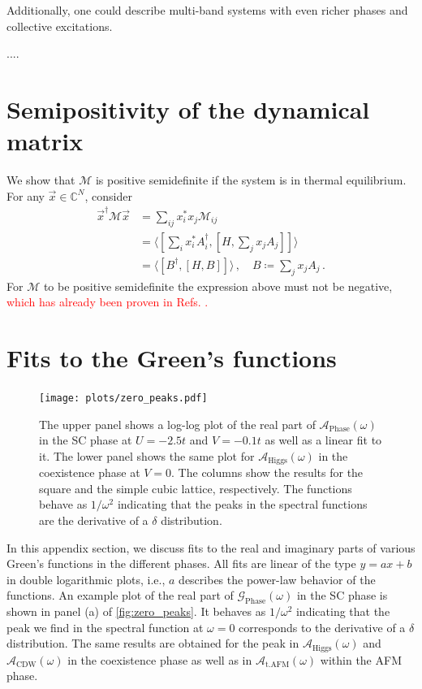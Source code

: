 \documentclass[
    reprint, 
    aps,
    preprintnumbers,
    twocolumn,
    prb,
    superscriptaddress
]{revtex4-2}
\newcommand{\mM}{\mathcal{M}}
\newcommand{\greens}[1]{\mathcal{G}_\text{#1} (\omega)}
\newcommand{\spectral}[1]{\mathcal{A}_\text{#1}  (\omega)}
\begin{document}
Additionally, one could describe multi-band systems with even richer phases and collective excitations. 


\begin{acknowledgments} 
    ....
\end{acknowledgments}

\appendix
\section{Semipositivity of the dynamical matrix}
\label{sec:positive_M}

We show that $\mathcal{M}$ is positive semidefinite if the system is in thermal equilibrium.
For any $\vec{x} \in \mathbb{C}^N$, consider
\begin{align}
    \vec{x}^\dagger \mM \vec{x} &= \sum_{ij} x_i^* x_j \mM_{ij} \nonumber \\
        &= \langle \left[ \sum_i x_i^* A_i^\dagger, \left[ H, \sum_j x_j A_j \right] \right]  \rangle \nonumber \\
        &= \langle [B^\dagger, [H, B]] \rangle\,,\quad B \coloneqq  \sum_j x_j A_j\,.
\end{align}
For $\mM$ to be positive semidefinite the expression above must not be negative,
\textcolor{red}{which has already been proven in Refs. \cite{Dyson1978,mermin66}.}

\section{Fits to the Green's functions}
\label{sec:fit_greens_functions}

\begin{figure}
    \centering
    \texttt{[image: plots/zero\_peaks.pdf]}
    \caption{The upper panel shows a log-log plot of the real part of $\spectral{Phase}$ in the SC phase at $U=-2.5t$ and $V=-0.1t$ as well as a linear fit to it.
    The lower panel shows the same plot for $\spectral{Higgs}$ in the coexistence phase at $V=0$. The columns show the results for the square and the simple cubic lattice, respectively.
    The functions behave as $1/\omega^2$ indicating that the peaks in the spectral functions are the derivative of a $\delta$ distribution.}
    \label{fig:zero_peaks}
\end{figure}

In this appendix section, we discuss fits to the real and imaginary parts of various Green's functions in the different phases.
All fits are linear of the type $y = ax + b$ in double logarithmic plots, i.e., $a$ describes the power-law behavior of the functions.
An example plot of the real part of $\greens{Phase}$ in the SC phase is shown in panel (a) of \autoref{fig:zero_peaks}.
It behaves as $1/\omega^2$ indicating that the peak we find in the spectral function at $\omega=0$ corresponds to the derivative of a $\delta$ distribution.
The same results are obtained for the peak in $\spectral{Higgs}$ and $\spectral{CDW}$ in the coexistence phase as well as in $\spectral{t.AFM}$ within the AFM phase.
\end{document}
